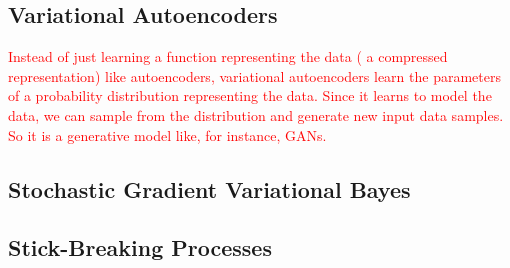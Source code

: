 \subsection{Variational Autoencoders}

\textcolor{red}{Instead of just learning a function representing the data ( a compressed representation) like autoencoders, variational autoencoders learn the parameters of a probability distribution representing the data. Since it learns to model the data, we can sample from the distribution and generate new input data samples. So it is a generative model like, for instance, GANs.}

\subsection{Stochastic Gradient Variational Bayes}

\subsection{Stick-Breaking Processes}